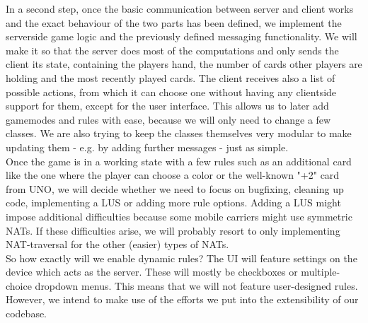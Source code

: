 \documentclass{report}
\begin{document}
In a second step, once the basic communication between server and client works and the exact behaviour of the two parts has been defined, we implement the serverside game logic and the previously defined messaging functionality.
We will make it so that the server does most of the computations and only sends the client its state, containing the players hand, the number of cards other players are holding and the most recently played cards. The client receives also a list of possible actions, from which it can choose one without having any clientside support for them, except for the user interface. This allows us to later add gamemodes and rules with ease, because we will only need to change a few classes.
We are also trying to keep the classes themselves very modular to make updating them - e.g. by adding further messages - just as simple.\\
Once the game is in a working state with a few rules such as an additional card like the one where the player can choose a color or the well-known "+2" card from UNO, we will decide whether we need to focus on bugfixing, cleaning up code, implementing a LUS or adding more rule options. Adding a LUS might impose additional difficulties because some mobile carriers might use symmetric NATs. If these difficulties arise, we will probably resort to only implementing NAT-traversal for the other (easier) types of NATs.\\

So how exactly will we enable dynamic rules? The UI will feature settings on the device which acts as the server. These will mostly be checkboxes or multiple-choice dropdown menus. This means that we will not feature user-designed rules. However, we intend to make use of the efforts we put into the extensibility of our codebase.\\
\end{document}
